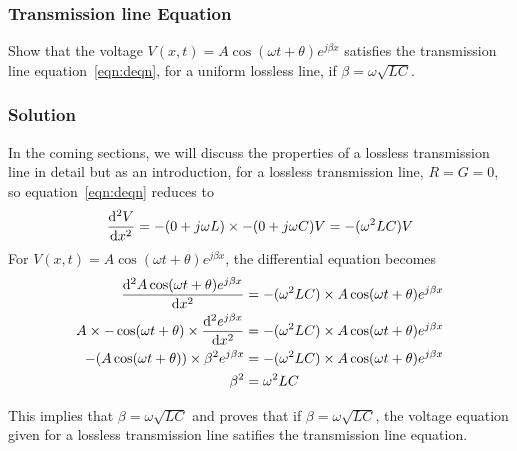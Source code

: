 \begin{exmp}
\subsubsection*{Transmission line Equation}
Show that the voltage $V(x,t) = A\cos(\omega t+\theta)e^{j\beta x}$ satisfies the transmission line equation~\eqref{eqn:deqn}, for a uniform lossless line, if $\beta = \omega\sqrt{LC}$.

\subsubsection*{Solution}
In the coming sections, we will discuss the properties of a lossless transmission line in detail but as an introduction, for a lossless transmission line, $R = G = 0$, so equation~\eqref{eqn:deqn} reduces to
\begin{dmath*}
\derivative[2]{V}{x} = -(0 + j\omega L)\times -(0 + j\omega C)V
= -(\omega^2 LC)V
\end{dmath*}
For $V(x,t) = A\cos(\omega t+\theta)e^{j\beta x}$, the differential equation becomes
\begin{align*}
\derivative[2]{A\cos(\omega t+\theta)e^{j\beta x}}{x} &= -(\omega^2 LC)\times A\cos(\omega t+\theta)e^{j\beta x}\\
A\times -\cos(\omega t+\theta)\times\derivative[2]{e^{j\beta x}}{x} &= -(\omega^2 LC)\times A\cos(\omega t+\theta)e^{j\beta x}\\
-(A\cos(\omega t+\theta))\times\beta^2e^{j\beta x} &= -(\omega^2 LC)\times A\cos(\omega t+\theta)e^{j\beta x}\\
\beta^2 &= \omega^2 LC
\end{align*}

This implies that $\beta = \omega\sqrt{LC}$ and proves that  if $\beta = \omega\sqrt{LC}$, the voltage equation given for a lossless transmission line satifies the transmission line equation.
\end{exmp}

